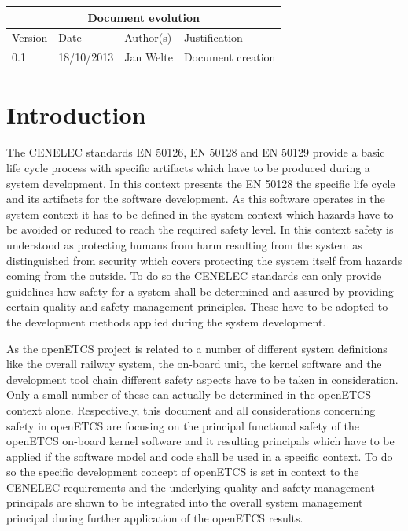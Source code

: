 \documentclass{template/openetcs_report}
\begin{document}
\begin{tabular}{|p{2.2cm}|p{2cm}|p{3cm}|p{5cm}|}
\hline
\multicolumn{4}{|c|}{Document evolution} \\
\hline
Version &  Date & Author(s) & Justification  \\
\hline
0.1 & 18/10/2013 & Jan Welte &  Document creation \\
\hline  
\hline  
\end{tabular}
\newpage


\mainmatter

\chapter{Introduction}
\label{sec:introduction}

 The CENELEC standards EN 50126, EN 50128 and EN 50129 provide a basic life cycle process with specific artifacts which have to be produced during a system development. In this context presents the EN 50128 the specific life cycle and its artifacts for the software development. As this software operates in the system context it has to be defined in the system context which hazards have to be avoided or reduced to reach the required safety level. In this context safety is understood as protecting humans from harm resulting from the system as distinguished from security which covers protecting the system itself from hazards coming from the outside. To  do so the CENELEC standards can only provide guidelines how safety for a system shall be determined and assured by providing certain quality and safety management principles. These have to be adopted to the development methods applied during the system development. 
 
 As the openETCS project is related to a number of different system definitions like the overall railway system, the on-board unit, the kernel software and the development tool chain different safety aspects have to be taken in consideration. Only a small number of these can actually be determined in the openETCS context alone. Respectively, this document and all considerations concerning safety in openETCS are focusing on the principal functional safety of the openETCS on-board kernel software and it resulting principals which have to be applied if the software model and code shall be used in a specific context. To do so the specific development concept of openETCS is set in context to the CENELEC requirements and the underlying quality and safety management principals are shown to be integrated into the overall system management principal during further application of the openETCS results.
\end{document}
